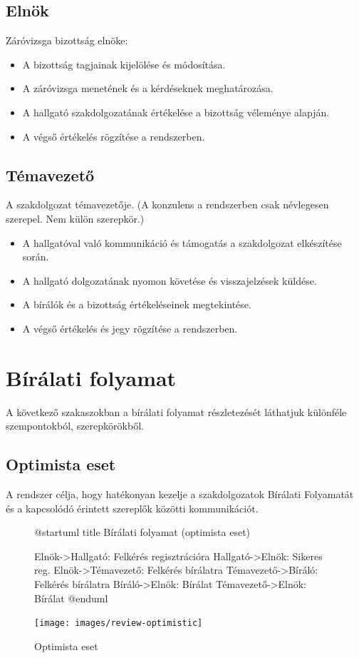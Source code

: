 \documentclass[a4paper,12pt]{article}
\begin{document}
\subsection{Elnök}

Záróvizsga bizottság elnöke:

\begin{itemize}
	\item A bizottság tagjainak kijelölése és módosítása.
	\item A záróvizsga menetének és a kérdéseknek meghatározása.
	\item A hallgató szakdolgozatának értékelése a bizottság véleménye alapján.
	\item A végső értékelés rögzítése a rendszerben.
\end{itemize}

\subsection{Témavezető}

A szakdolgozat témavezetője. (A konzulens a rendszerben csak névlegesen szerepel. Nem külön szerepkör.)

\begin{itemize}
	\item A hallgatóval való kommunikáció és támogatás a szakdolgozat elkészítése során.
	\item A hallgató dolgozatának nyomon követése és visszajelzések küldése.
	\item A bírálók és a bizottság értékeléseinek megtekintése.
	\item A végső értékelés és jegy rögzítése a rendszerben.
\end{itemize}

\section{Bírálati folyamat}

A következő szakaszokban a bírálati folyamat részletezését láthatjuk különféle szempontokból, szerepkörökből.

\subsection{Optimista eset}

A rendszer célja, hogy hatékonyan kezelje a szakdolgozatok Bírálati Folyamatát és a kapcsolódó érintett szereplők közötti kommunikációt. 

\begin{figure}
\centering
\begin{plantuml}
@startuml
title Bírálati folyamat (optimista eset)

Elnök->Hallgató: Felkérés regisztrációra
Hallgató->Elnök: Sikeres reg.
Elnök->Témavezető: Felkérés bírálatra
Témavezető->Bíráló: Felkérés bírálatra
Bíráló->Elnök: Bírálat
Témavezető->Elnök: Bírálat
@enduml
\end{plantuml}
\texttt{[image: images/review-optimistic]}
\caption{Optimista eset}
\label{fig:review-optimistic}
\end{figure}
\end{document}
